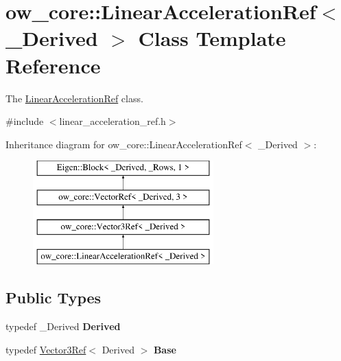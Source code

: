 \hypertarget{classow__core_1_1LinearAccelerationRef}{}\section{ow\+\_\+core\+:\+:Linear\+Acceleration\+Ref$<$ \+\_\+\+Derived $>$ Class Template Reference}
\label{classow__core_1_1LinearAccelerationRef}


The \hyperlink{classow__core_1_1LinearAccelerationRef}{Linear\+Acceleration\+Ref} class.  




{\ttfamily \#include $<$linear\+\_\+acceleration\+\_\+ref.\+h$>$}

Inheritance diagram for ow\+\_\+core\+:\+:Linear\+Acceleration\+Ref$<$ \+\_\+\+Derived $>$\+:\begin{figure}[H]
\begin{center}
\leavevmode
\includegraphics[height=4.000000cm]{d2/d75/classow__core_1_1LinearAccelerationRef}
\end{center}
\end{figure}
\subsection*{Public Types}
\begin{DoxyCompactItemize}
\item 
typedef \+\_\+\+Derived {\bfseries Derived}\hypertarget{classow__core_1_1LinearAccelerationRef_aba03ae2dd6572abc254c71c0b4032bd1}{}\label{classow__core_1_1LinearAccelerationRef_aba03ae2dd6572abc254c71c0b4032bd1}

\item 
typedef \hyperlink{classow__core_1_1Vector3Ref}{Vector3\+Ref}$<$ Derived $>$ {\bfseries Base}\hypertarget{classow__core_1_1LinearAccelerationRef_ae563452edb03b1441c6388427df13ad0}{}\label{classow__core_1_1LinearAccelerationRef_ae563452edb03b1441c6388427df13ad0}

\end{DoxyCompactItemize}
